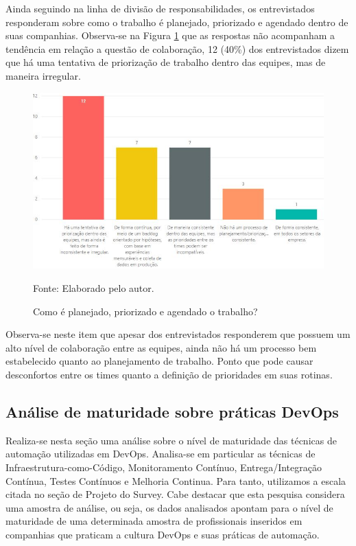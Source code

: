 \documentclass[twoside,english,brazilian]{UNISINOSartigo}
\newcommand{\source}[1]{\caption*{Fonte: {#1}} }
\begin{document}
Ainda seguindo na linha de divisão de responsabilidades, os entrevistados responderam sobre como o trabalho é planejado, priorizado e agendado dentro de suas companhias. Observa-se na Figura \ref{fig:planejamentoTrabalho} que as respostas não acompanham a tendência em relação a questão de colaboração, 12 (40\%) dos entrevistados dizem que há uma tentativa de priorização de trabalho dentro das equipes, mas de maneira irregular. 
\begin{figure}[H]
    \centering
    \caption{Como é planejado, priorizado e agendado o trabalho?}
       \includegraphics[scale=.6]{imagens/priorizacao.JPG}
        \source{Elaborado pelo autor.}
    \label{fig:planejamentoTrabalho}
\end{figure}
Observa-se neste item que apesar dos entrevistados responderem que possuem um alto nível de colaboração entre as equipes, ainda não há um processo bem estabelecido quanto ao planejamento de trabalho. Ponto que pode causar desconfortos entre os times quanto a definição de prioridades em suas rotinas.

\subsection{Análise de maturidade sobre práticas DevOps}
Realiza-se nesta seção uma análise sobre o nível de maturidade das técnicas de automação utilizadas em DevOps. Analisa-se em particular as técnicas de Infraestrutura-como-Código, Monitoramento Contínuo, Entrega/Integração Contínua, Testes Contínuos e Melhoria Continua. Para tanto, utilizamos a escala citada no seção de Projeto do Survey.  Cabe destacar que esta pesquisa considera uma amostra de análise, ou seja, os dados analisados apontam para o nível de maturidade de uma determinada amostra de profissionais inseridos em companhias que praticam a cultura DevOps e suas práticas de automação.
\end{document}

